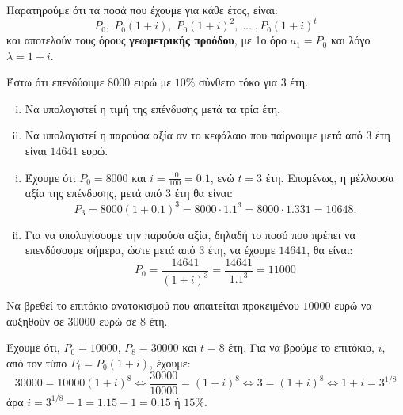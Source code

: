 \begin{rem}
  Παρατηρούμε ότι τα ποσά που έχουμε για κάθε έτος, είναι:
  \[
    P_{0}, \; P_{0}(1+i), \; P_{0}(1+i)^{2}, \; \ldots \;, P_{0}(1+i)^{t} 
  \] 
  και αποτελούν τους όρους \textbf{γεωμετρικής προόδου}, με 1ο όρο $ a_{1}=P_{0} $ και 
  λόγο $ \lambda =1+i $.
\end{rem}

\begin{example}
  Έστω ότι επενδύουμε $ 8000 $ ευρώ με $ 10 \% $ σύνθετο τόκο για 3 έτη.
  \begin{enumerate}[i)]
    \item Να υπολογιστεί η τιμή της επένδυσης μετά τα τρία έτη.
    \item Να υπολογιστεί η παρούσα αξία αν το κεφάλαιο που παίρνουμε μετά από 3 έτη 
      είναι $14641$ ευρώ.
  \end{enumerate}
\end{example}
\begin{solution}
\item {}
  \begin{enumerate}[i)]
    \item 
      Έχουμε ότι $ P_{0} = 8000  $ και $ i= \frac{10}{100} = 0.1 $, ενώ $ t=3 $ έτη. 
      Επομένως, η μέλλουσα αξία της επένδυσης, μετά από 3 έτη θα είναι:
      \[
        P_{3} = 8000(1+0.1)^{3} = 8000 \cdot 1.1^{3} = 8000 \cdot 1.331 = 10648.
      \] 
    \item Για να υπολογίσουμε την παρούσα αξία, δηλαδή το ποσό που πρέπει να 
      επενδύσουμε σήμερα, ώστε μετά από 3 έτη, να έχουμε $14641$, θα είναι:
      \[
        P_{0} = \frac{14641}{(1+i)^{3}} = \frac{14641}{1.1^{3}} = 11000 
      \] 
  \end{enumerate}
\end{solution}

\begin{example}
  Να βρεθεί το επιτόκιο ανατοκισμού που απαιτείται προκειμένου $10000$ ευρώ να αυξηθούν 
  σε $30000$ ευρώ σε 8 έτη.
\end{example}
\begin{solution}
  Έχουμε ότι, $P_{0}=10000$, $ P_{8}=30000 $ και $ t=8 $ έτη. Για να βρούμε το επιτόκιο,
  $ i $, από τον τύπο $ P_{t}=P_{0}(1+i) $, έχουμε:
  \[
    30000 = 10000(1+i)^{8} \Leftrightarrow \frac{30000}{10000} = (1+i)^{8} \Leftrightarrow
    3 = (1+i)^{8} \Leftrightarrow 1+i = 3^{1/8} 
  \] 
  άρα $ i = 3^{1/8} -1 = 1.15-1 = 0.15 $ ή $ 15\% $.
\end{solution}

